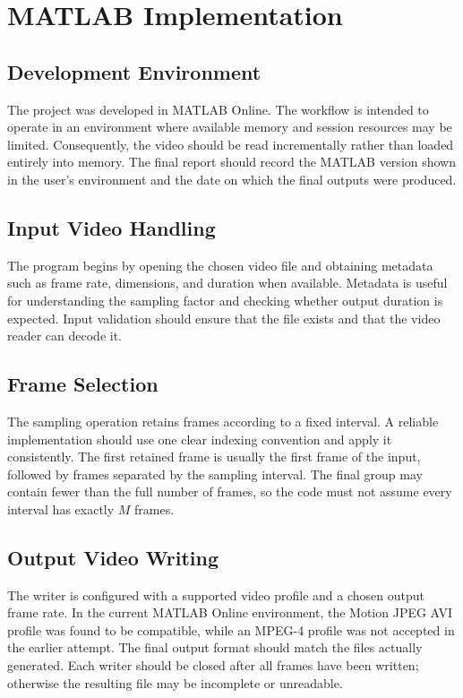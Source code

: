 \documentclass[12pt,a4paper,oneside]{report}
\begin{document}
\chapter{MATLAB Implementation}
\section{Development Environment}
The project was developed in MATLAB Online. The workflow is intended to operate in an environment where available memory and session resources may be limited. Consequently, the video should be read incrementally rather than loaded entirely into memory. The final report should record the MATLAB version shown in the user's environment and the date on which the final outputs were produced.

\section{Input Video Handling}
The program begins by opening the chosen video file and obtaining metadata such as frame rate, dimensions, and duration when available. Metadata is useful for understanding the sampling factor and checking whether output duration is expected. Input validation should ensure that the file exists and that the video reader can decode it.

\section{Frame Selection}
The sampling operation retains frames according to a fixed interval. A reliable implementation should use one clear indexing convention and apply it consistently. The first retained frame is usually the first frame of the input, followed by frames separated by the sampling interval. The final group may contain fewer than the full number of frames, so the code must not assume every interval has exactly $M$ frames.

\section{Output Video Writing}
The writer is configured with a supported video profile and a chosen output frame rate. In the current MATLAB Online environment, the Motion JPEG AVI profile was found to be compatible, while an MPEG-4 profile was not accepted in the earlier attempt. The final output format should match the files actually generated. Each writer should be closed after all frames have been written; otherwise the resulting file may be incomplete or unreadable.
\end{document}

